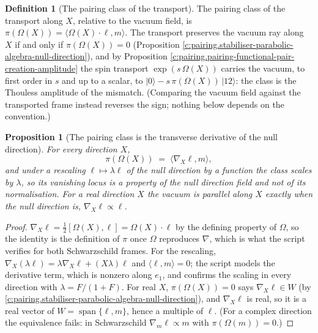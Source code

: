 \documentclass[11pt]{article}
\newtheorem{proposition}[theorem]{Proposition}
\theoremstyle{definition}
\newtheorem{definition}[theorem]{Definition}
\theoremstyle{plain}
\providecommand{\pv}{}\renewcommand{\pv}{\pi}
\providecommand{\ip}{}\renewcommand{\ip}[2]{\langle #1, #2\rangle}
\providecommand{\ket}{}\renewcommand{\ket}[1]{|#1\rangle}
\begin{document}
\begin{definition}[The pairing class of the transport]\label{c:obj.pairing.pairing-class-transport}
The pairing class of the transport along $X$, relative to the vacuum field, is $\pv(\Omega(X)) = \ip{\Omega(X)\cdot\ell}{m}$. The transport preserves the vacuum ray along $X$ if and only if $\pv(\Omega(X)) = 0$ (Proposition \ref{c:pairing.stabiliser-parabolic-algebra-null-direction}), and by Proposition \ref{c:pairing.pairing-functional-pair-creation-amplitude} the spin transport $\exp(s\,\Omega(X))$ carries the vacuum, to first order in $s$ and up to a scalar, to $\ket{0} - s\,\pv(\Omega(X))\,\ket{12}$: the class is the Thouless amplitude of the mismatch. (Comparing the vacuum field against the transported frame instead reverses the sign; nothing below depends on the convention.)
\end{definition}

\begin{proposition}[The pairing class is the transverse derivative of the null direction]\label{c:pairing.pairing-class-transverse-derivative-null-direction}
For every direction $X$,
\[
\pv(\Omega(X)) \;=\; \ip{\nabla_{X}\ell}{m},
\]
and under a rescaling $\ell \mapsto \lambda\ell$ of the null direction by a function the class scales by $\lambda$, so its vanishing locus is a property of the null direction field and not of its normalisation. For a real direction $X$ the vacuum is parallel along $X$ exactly when the null direction is, $\nabla_{X}\ell \propto \ell$.
\end{proposition}
\begin{proof}
$\nabla_{X}\ell = \tfrac12[\Omega(X), \ell] = \Omega(X)\cdot\ell$ by the defining property of $\Omega$, so the identity is the definition of $\pv$ once $\Omega$ reproduces $\nabla$, which is what the script verifies for both Schwarzschild frames. For the rescaling, $\nabla_{X}(\lambda\ell) = \lambda\nabla_{X}\ell + (X\lambda)\ell$ and $\ip{\ell}{m} = 0$; the script models the derivative term, which is nonzero along $e_{1}$, and confirms the scaling in every direction with $\lambda = F/(1+F)$. For real $X$, $\pv(\Omega(X)) = 0$ says $\nabla_{X}\ell \in W$ (by \ref{c:pairing.stabiliser-parabolic-algebra-null-direction}), and $\nabla_{X}\ell$ is real, so it is a real vector of $W = \operatorname{span}\{\ell, m\}$, hence a multiple of $\ell$. (For a complex direction the equivalence fails: in Schwarzschild $\nabla_{m}\ell \propto m$ with $\pv(\Omega(m)) = 0$.)

\end{proof}
\end{document}
